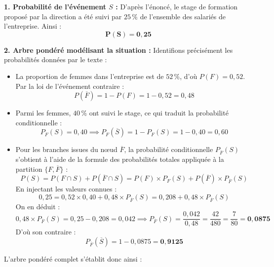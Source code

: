 \documentclass[11pt,a4paper]{article}
\begin{document}
\begin{correctionbox}
\textbf{1. Probabilité de l'événement $S$ :}
D'après l'énoncé, le stage de formation proposé par la direction a été suivi par $25\,\%$ de l'ensemble des salariés de l'entreprise. Ainsi :
\[
\mathbf{P(S) = 0{,}25}
\]

\textbf{2. Arbre pondéré modélisant la situation :}
Identifions précisément les probabilités données par le texte :
\begin{itemize}[label=$\bullet$]
    \item La proportion de femmes dans l'entreprise est de $52\,\%$, d'où $P(F) = 0{,}52$. Par la loi de l'événement contraire :
    \[
    P(\overline{F}) = 1 - P(F) = 1 - 0{,}52 = 0{,}48
    \]
    \item Parmi les femmes, $40\,\%$ ont suivi le stage, ce qui traduit la probabilité conditionnelle :
    \[
    P_F(S) = 0{,}40 \implies P_F(\overline{S}) = 1 - P_F(S) = 1 - 0{,}40 = 0{,}60
    \]
    \item Pour les branches issues du nœud $\overline{F}$, la probabilité conditionnelle $P_{\overline{F}}(S)$ s'obtient à l'aide de la formule des probabilités totales appliquée à la partition $\{F, \overline{F}\}$ :
    \[
    P(S) = P(F \cap S) + P(\overline{F} \cap S) = P(F) \times P_F(S) + P(\overline{F}) \times P_{\overline{F}}(S)
    \]
    En injectant les valeurs connues :
    \[
    0{,}25 = 0{,}52 \times 0{,}40 + 0{,}48 \times P_{\overline{F}}(S) = 0{,}208 + 0{,}48 \times P_{\overline{F}}(S)
    \]
    On en déduit :
    \[
    0{,}48 \times P_{\overline{F}}(S) = 0{,}25 - 0{,}208 = 0{,}042 \implies P_{\overline{F}}(S) = \frac{0{,}042}{0{,}48} = \frac{42}{480} = \frac{7}{80} = \mathbf{0{,}0875}
    \]
    D'où son contraire :
    \[
    P_{\overline{F}}(\overline{S}) = 1 - 0{,}0875 = \mathbf{0{,}9125}
    \]
\end{itemize}

L'arbre pondéré complet s'établit donc ainsi :
\begin{center}
\end{center}
\end{correctionbox}
\end{document}
